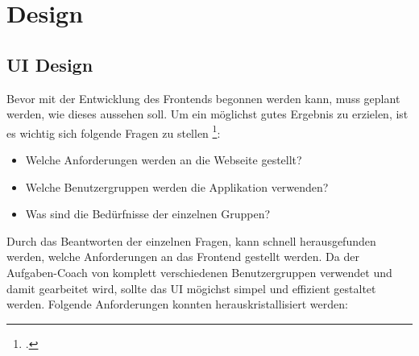 \section{Design}
\subsection{UI Design}
Bevor mit der Entwicklung des Frontends begonnen werden kann, muss geplant werden, wie dieses aussehen soll. Um ein möglichst gutes Ergebnis zu erzielen, ist es wichtig sich folgende Fragen zu stellen \footcite{ui_design_questions}:

\begin{itemize}
	\item Welche Anforderungen werden an die Webseite gestellt?
	\item Welche Benutzergruppen werden die Applikation verwenden?
	\item Was sind die Bedürfnisse der einzelnen Gruppen?
\end{itemize}

Durch das Beantworten der einzelnen Fragen, kann schnell herausgefunden werden, welche Anforderungen an das Frontend gestellt werden. Da der Aufgaben-Coach von komplett verschiedenen Benutzergruppen verwendet und damit gearbeitet wird, sollte das UI mögichst simpel und effizient gestaltet werden. Folgende Anforderungen konnten herauskristallisiert werden:

